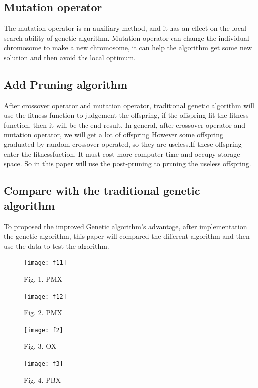 \documentclass[12pt]{article}
\begin{document}
\subsection{Mutation operator}
The mutation operator is an auxiliary method, and it has an effect on the local search ability of genetic algorithm. Mutation operator can change the individual chromosome to make a new chromosome, it can help the algorithm get some new solution and then avoid the local optimum.
\subsection{Add Pruning algorithm}
 After crossover operator and mutation operator, traditional genetic algorithm will use the fitness function to judgement the offspring, if the offspring fit the fitness function, then it will be the end result. In general, after crossover operator and mutation operator, we will get a lot of offspring However some offspring graduated by random crossover operated, so they are useless.If these offspring enter the fitnessfuction, It must cost more computer time and occupy storage space. So in this paper will use the post-pruning to pruning the useless offspring. 
\subsection{Compare with the traditional genetic algorithm }
To proposed the improved Genetic algorithm's advantage, after implementation the genetic algorithm, this paper will compared the different algorithm and then use the data to test the algorithm. 

	\small
	
	
\begin{figure}[h]
	\centering
	\texttt{[image: f11]}
	\caption{Fig. 1. PMX}
\end{figure}

\begin{figure}[h]
	\centering
	\texttt{[image: f12]}
	\caption{Fig. 2. PMX}
\end{figure}

\begin{figure}[h]
	\centering
	\texttt{[image: f2]}
	\caption{Fig. 3. OX}
\end{figure}

\begin{figure}[h]
	\centering
	\texttt{[image: f3]}
	\caption{Fig. 4. PBX}
\end{figure}
\end{document}
